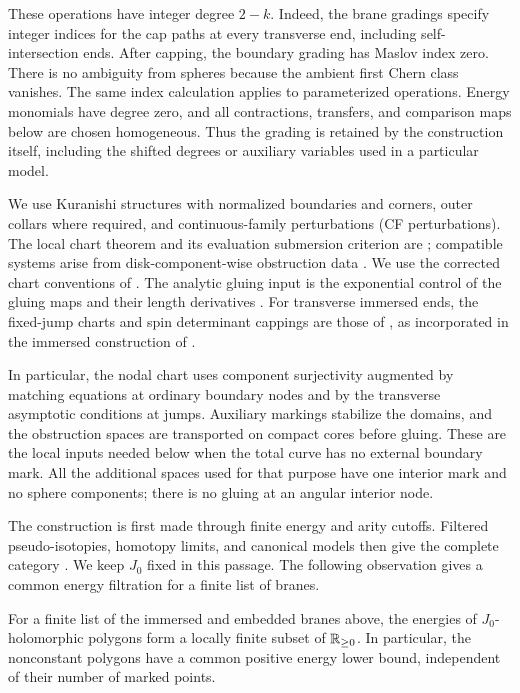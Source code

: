 These operations have integer degree $2-k$.  Indeed, the brane
gradings specify integer indices for the cap paths at every transverse
end, including self-intersection ends.  After capping, the boundary
grading has Maslov index zero.  There is no ambiguity from spheres
because the ambient first Chern class vanishes.  The same index
calculation applies to parameterized operations.  Energy monomials
have degree zero, and all contractions, transfers, and comparison
maps below are chosen homogeneous.  Thus the grading is retained by
the construction itself, including the shifted degrees or auxiliary
variables used in a particular model.

We use Kuranishi structures with normalized boundaries and corners,
outer collars where required, and continuous-family perturbations
(CF perturbations).  The local chart theorem and its evaluation
submersion criterion are
\cite[Theorem~7.1, Condition~7.11, and Lemma~7.12]{FOOOChartsI};
compatible systems arise from disk-component-wise obstruction data
\cite[Theorems~5.3 and~5.4]{FOOOChartsII}.  We use the corrected chart
conventions of \cite{FOOOChartsICorrigendum}.
The analytic gluing input is the exponential control of the gluing
maps and their length derivatives
\cite[Assumption~3.12 and Theorems~3.13, 6.4, 8.16, and~8.17]{FOOOGluing}.
For transverse immersed ends, the fixed-jump charts and spin
determinant cappings are those of
\cite[Sections~4--5]{AkahoJoyce}, as incorporated in the immersed
construction of \cite{AFOOO2026}.

In particular, the nodal chart uses component surjectivity augmented
by matching equations at ordinary boundary nodes and by the transverse
asymptotic conditions at jumps.  Auxiliary markings stabilize the
domains, and the obstruction spaces are transported on compact cores
before gluing.  These are the local inputs needed below when the total
curve has no external boundary mark.  All the additional spaces used
for that purpose have one interior mark and no sphere
components; there is no gluing at an angular interior node.

The construction is first made through finite energy and arity
cutoffs.  Filtered pseudo-isotopies, homotopy limits, and canonical
models then give the complete category
\cite[Sections~6, 9--10, and~12, in particular Propositions~9.55
and~12.10]{AFOOO2026}.  We keep $J_0$ fixed in this passage.  The
following observation gives a common energy filtration for a finite
list of branes.

\begin{lemma}\label{curv:energy}
For a finite list of the immersed and embedded branes above, the
energies of $J_0$-holomorphic polygons form a locally finite subset of
$\mathbb R_{\geq0}$.  In particular, the nonconstant polygons have a common
positive energy lower bound, independent of their number of marked
points.
\end{lemma}

